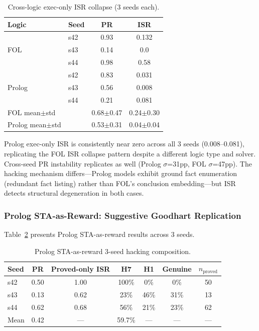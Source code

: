 \documentclass[11pt,a4paper]{article}
\newcommand{\isr}{\textsc{ISR}}
\newcommand{\pr}{\textsc{PR}}
\begin{document}
\begin{table}[h]
\centering
\caption{Cross-logic exec-only ISR collapse (3 seeds each).}
\label{tab:cross_logic_exec}
\begin{tabular}{llcc}
\toprule
Logic & Seed & PR & ISR \\
\midrule
\multirow{3}{*}{FOL}
& s42 & 0.93 & 0.132 \\
& s43 & 0.14 & 0.0 \\
& s44 & 0.98 & 0.58 \\
\midrule
\multirow{3}{*}{Prolog}
& s42 & 0.83 & 0.031 \\
& s43 & 0.56 & 0.008 \\
& s44 & 0.21 & 0.081 \\
\midrule
FOL mean$\pm$std && 0.68$\pm$0.47 & 0.24$\pm$0.30 \\
Prolog mean$\pm$std && 0.53$\pm$0.31 & 0.04$\pm$0.04 \\
\bottomrule
\end{tabular}
\end{table}

Prolog exec-only \isr{} is consistently near zero across all 3 seeds (0.008--0.081), replicating the FOL ISR collapse pattern despite a different logic type and solver.
Cross-seed \pr{} instability replicates as well (Prolog $\sigma$=31pp, FOL $\sigma$=47pp).
The hacking mechanism differs---Prolog models exhibit ground fact enumeration (redundant fact listing) rather than FOL's conclusion embedding---but \isr{} detects structural degeneration in both cases.

\subsubsection{Prolog STA-as-Reward: Suggestive Goodhart Replication}

Table~\ref{tab:prolog_sta} presents Prolog STA-as-reward results across 3 seeds.

\begin{table}[h]
\centering
\caption{Prolog STA-as-reward 3-seed hacking composition.}
\label{tab:prolog_sta}
\begin{tabular}{lcccccc}
\toprule
Seed & PR & Proved-only ISR & H7 & H1 & Genuine & $n_{\text{proved}}$ \\
\midrule
s42 & 0.50 & 1.00 & 100\% & 0\% & 0\% & 50 \\
s43 & 0.13 & 0.62 & 23\% & 46\% & 31\% & 13 \\
s44 & 0.62 & 0.68 & 56\% & 21\% & 23\% & 62 \\
\midrule
Mean & 0.42 & --- & 59.7\% & --- & --- & --- \\
\bottomrule
\end{tabular}
\end{table}
\end{document}
